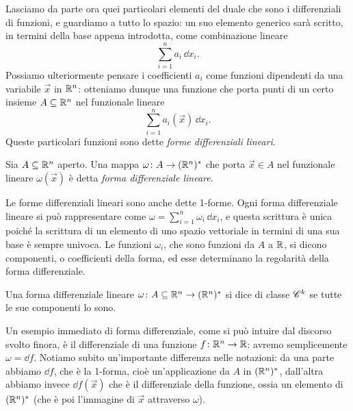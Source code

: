 Lasciamo da parte ora quei particolari elementi del duale che sono i differenziali di funzioni, e guardiamo a tutto lo spazio: un suo elemento generico sarà scritto, in termini della base appena introdotta, come combinazione lineare
\begin{equation*}
	\sum_{i=1}^na_i\,\dd x_i.
\end{equation*}
Possiamo ulteriormente pensare i coefficienti $a_i$ come funzioni dipendenti da una variabile $\vec x$ in $\R^n$: otteniamo dunque una funzione che porta punti di un certo insieme $A\subseteq\R^n$ nel funzionale lineare
\begin{equation*}
	\sum_{i=1}^na_i(\vec x)\,\dd x_i.
\end{equation*}
Queste particolari funzioni sono dette \emph{forme differenziali lineari}.

\begin{definizione} \label{d:forma-differenziale-lineare}
	Sia $A\subseteq\R^n$ aperto.
	Una mappa $\omega\colon A\to(\R^n)^*$ che porta $\vec x\in A$ nel funzionale lineare $\omega(\vec x)$ è detta \emph{forma differenziale lineare}.
\end{definizione}
Le forme differenziali lineari sono anche dette 1-forme.
Ogni forma differenziale lineare si può rappresentare come $\omega=\sum_{i=1}^n\omega_i\,\dd x_i$, e questa scrittura è unica poich\'e la scrittura di un elemento di uno spazio vettoriale in termini di una sua base è sempre univoca.
Le funzioni $\omega_i$, che sono funzioni da $A$ a $\R$, si dicono componenti, o coefficienti della forma, ed esse determinano la regolarità della forma differenziale.
\begin{definizione} \label{d:regolarita-1forme}
	Una forma differenziale lineare $\omega\colon A\subseteq\R^n\to(\R^n)^*$ si dice di classe $\cclass[k]$ se tutte le sue componenti lo sono.
\end{definizione}

Un esempio immediato di forma differenziale, come si può intuire dal discorso svolto finora, è il differenziale di una funzione $f\colon\R^n\to\R$: avremo semplicemente $\omega=\dd f$.
Notiamo subito un'importante differenza nelle notazioni: da una parte abbiamo $\dd f$, che è la 1-forma, cioè un'applicazione da $A$ in $(\R^n)^*$, dall'altra abbiamo invece $\dd f(\vec x)$ che è il differenziale della funzione, ossia un elemento di $(\R^n)^*$ (che è poi l'immagine di $\vec x$ attraverso $\omega$).
